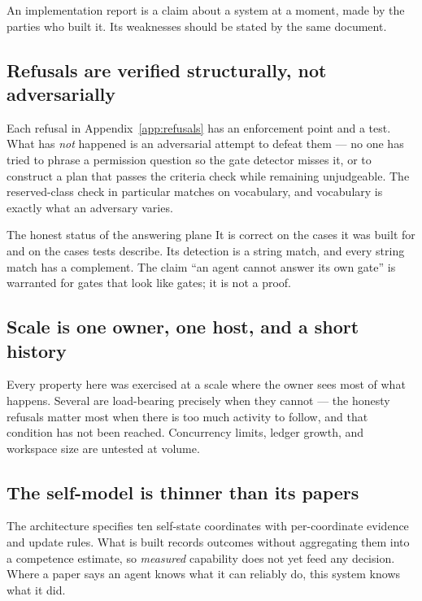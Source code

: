 \documentclass[11pt]{article}
\begin{document}
An implementation report is a claim about a system at a moment, made by the parties who built it. Its weaknesses should be stated by the same document.

\subsection{Refusals are verified structurally, not adversarially}

Each refusal in Appendix~\ref{app:refusals} has an enforcement point and a test. What has \emph{not} happened is an adversarial attempt to defeat them --- no one has tried to phrase a permission question so the gate detector misses it, or to construct a plan that passes the criteria check while remaining unjudgeable. The reserved-class check in particular matches on vocabulary, and vocabulary is exactly what an adversary varies.

\begin{cautionbox}{The honest status of the answering plane}
It is correct on the cases it was built for and on the cases tests describe. Its detection is a string match, and every string match has a complement. The claim ``an agent cannot answer its own gate'' is warranted for gates that look like gates; it is not a proof.
\end{cautionbox}

\subsection{Scale is one owner, one host, and a short history}

Every property here was exercised at a scale where the owner sees most of what happens. Several are load-bearing precisely when they cannot --- the honesty refusals matter most when there is too much activity to follow, and that condition has not been reached. Concurrency limits, ledger growth, and workspace size are untested at volume.

\subsection{The self-model is thinner than its papers}

The architecture specifies ten self-state coordinates with per-coordinate evidence and update rules. What is built records outcomes without aggregating them into a competence estimate, so \emph{measured} capability does not yet feed any decision. Where a paper says an agent knows what it can reliably do, this system knows what it did.
\end{document}
